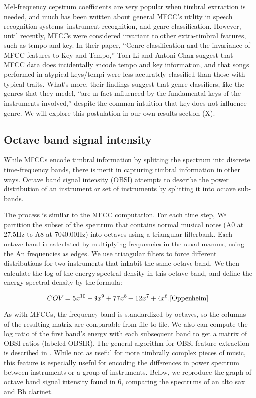 \documentclass[10pt,twocolumn]{article}
\begin{document}
Mel-frequency cepstrum coefficients are very popular when timbral extraction is needed, and much has been written about general MFCC’s utility in speech recognition systems, instrument recognition, and genre classification. However, until recently, MFCCs were considered invariant to other extra-timbral features, such as tempo and key. In their paper, “Genre classification and the invariance of MFCC features to Key and Tempo,” Tom Li and Antoni Chan suggest that MFCC data does incidentally encode tempo and key information, and that songs performed in atypical keys/tempi were less accurately classified than those with typical traits. What’s more, their findings suggest that genre classifiers, like the genres that they model, “are in fact influenced by the fundamental keys of the instruments involved,” despite the common intuition that key does not influence genre. \cite{LiChan} We will explore this postulation in our own results section (X).

\subsection{Octave band signal intensity}

While MFCCs encode timbral information by splitting the spectrum into discrete time-frequency bands, there is merit in capturing timbral information in other ways. Octave band signal intensity (OBSI) attempts to describe the power distribution of an instrument or set of instruments by splitting it into octave sub-bands. 


The process is similar to the MFCC computation. For each time step, We partition the subset of the spectrum that contains normal musical notes (A0 at 27.5Hz to A8 at 7040.00Hz) into octaves using a triangular filterbank. Each octave band is calculated by multiplying frequencies in the usual manner, using the An frequencies as edges. We use triangular filters to force different distributions for two instruments that inhabit the same octave band. We then calculate the log of the energy spectral density in this octave band, and define the energy spectral density by the formula:

$$
COV = 5x^{10}-9x^9 + 77x^8 + 12x^7 + 4x^6.
\cite{Oppenheim}
$$

As with MFCCs, the frequency band is standardized by octaves, so the columns of the resulting matrix are comparable from file to file. We also can compute the log ratio of the first band’s energy with each subsequent band to get a matrix of OBSI ratios (labeled OBSIR). The general algorithm for OBSI feature extraction is described in \cite{Essid}. While not as useful for more timbrally complex pieces of music, this feature is especially useful for encoding the differences in power spectrum between instruments or a group of instruments. Below, we reproduce the graph of octave band signal intensity found in 6, comparing the spectrums of an alto sax and Bb clarinet.
\end{document}
